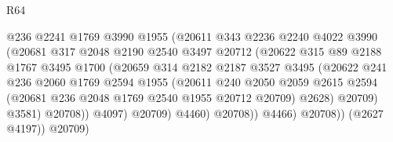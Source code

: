 \begin{lexlean}{R64}
\begin{coremodule}
                                  @236
                                  @2241
                                  @1769
                                  @3990
                                  @1955
                                  (@20611
                                    @343
                                    @2236
                                    @2240
                                    @4022
                                    @3990
                                    (@20681
                                      @317
                                      @2048
                                      @2190
                                      @2540
                                      @3497
                                      @20712
                                      (@20622
                                        @315
                                        @89
                                        @2188
                                        @1767
                                        @3495
                                        @1700
                                        (@20659
                                          @314
                                          @2182
                                          @2187
                                          @3527
                                          @3495
                                          (@20622
                                            @241
                                            @236
                                            @2060
                                            @1769
                                            @2594
                                            @1955
                                            (@20611
                                              @240
                                              @2050
                                              @2059
                                              @2615
                                              @2594
                                              (@20681 @236 @2048 @1769 @2540 @1955 @20712 @20709)
                                              @2628)
                                            @20709)
                                          @3581)
                                        @20708))
                                    @4097)
                                  @20709)
                                @4460)
                              @20708))
                          @4466)
                        @20708))
                    (@2627 @4197))
                  @20709)

\end{coremodule}
\end{lexlean}
